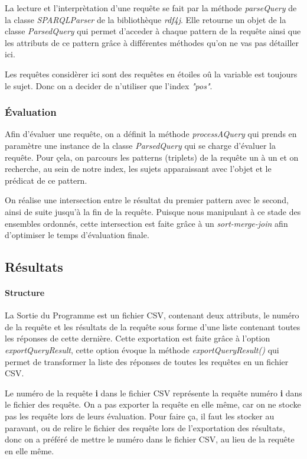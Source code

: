 \documentclass[12pt,titlepage]{article}
\begin{document}
La lecture et l'interprètation d'une requête se fait par la méthode \textit{parseQuery} de la classe \textit{SPARQLParser} de la bibliothèque \textit{rdf4j}. Elle retourne un objet de la classe \textit{ParsedQuery} qui permet d'acceder à chaque pattern de la requête ainsi que les attributs de ce pattern grâce à différentes méthodes qu'on ne vas pas détailler ici.

Les requêtes considèrer ici sont des requêtes en étoiles oû la variable est toujours le sujet. Donc on a decider de n'utiliser que l'index \textit{"pos"}.

\subsubsection{Évaluation}

Afin d'évaluer une requête, on a définit la méthode \textit{processAQuery} qui prends en paramètre une instance de la classe \textit{ParsedQuery} qui se charge d'évaluer la requête. Pour çela, on parcours les patterns (triplets) de la requête un à un et on recherche, au sein de notre index, les sujets apparaissant avec l'objet et le prédicat de ce pattern.

On réalise une intersection entre le résultat du premier pattern avec le second, ainsi de suite jusqu'à la fin de la requête. Puisque nous manipulant à ce stade des ensembles ordonnés, cette intersection est faite grâce à un \textit{sort-merge-join} afin d'optimiser le temps d'évaluation finale.

\subsection{Résultats}

\paragraph{Structure}

La Sortie du Programme est un fichier CSV, contenant deux attributs, le numéro de la requête
et les résultats de la requête sous forme d'une liste contenant toutes les réponses de cette dernière.
Cette exportation est faite grâce à l'option \textit{exportQueryResult}, cette option évoque la méthode \textit{exportQueryResult()} qui permet de transformer la liste des réponses de toutes les requêtes en un fichier CSV.

Le numéro de la requête \textbf{i} dans le fichier CSV représente la requête numéro \textbf{i} dans le fichier des requête. On a pas exporter la requête en elle même, car on ne stocke pas les requête lors de leurs évaluation. Pour faire ça, il faut les stocker au paravant, ou de relire le fichier des requête lors de l'exportation des résultats, donc on a préféré de mettre le numéro dans le fichier CSV, au lieu de la requête en elle même.  
\end{document}
